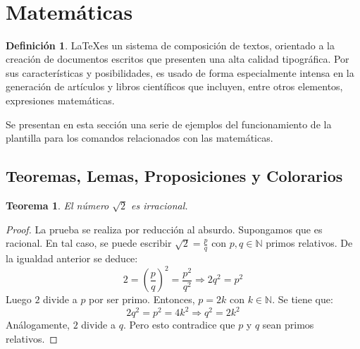 \documentclass{article}
\title{                                             %
    \vspace{2in}
    \textmd{\textbf{\asignatura \\ \titulo}} \\         %
    \normalsize\vspace{0.1in}\small{\fecha}  \\         %
    \vspace{3in}
}
\author{\textbf{\autor}}                            %
\date{}                                             %
\theoremstyle{theorem-style}  %
\newtheorem{theorem}{Teorema}[section]  %
\theoremstyle{definition}
\newtheorem{definition}{Definición}[section]
\theoremstyle{example-style}
\begin{document}
\maketitle



\newpage
\tableofcontents
\newpage


\section{Matemáticas}

    \begin{definition}
        \LaTeX es un sistema de composición de textos, orientado a la creación de documentos escritos que presenten una alta calidad tipográfica. Por sus características y  posibilidades, es usado de forma especialmente intensa en la generación de artículos y libros científicos que incluyen, entre otros elementos, expresiones matemáticas.
    \end{definition}
    
    Se presentan en esta sección una serie de ejemplos del funcionamiento de la plantilla 
    para los comandos relacionados con las matemáticas.
    
    \subsection{Teoremas, Lemas, Proposiciones y Colorarios}
    
        \begin{theorem}
            El número $\sqrt{2}$ es irracional.
        \end{theorem}
        \begin{proof}
            La prueba se realiza por reducción al absurdo. Supongamos que es racional. En tal caso, se puede escribir $\sqrt{2} = \frac{p}{q}$ con $p,q \in \mathbb{N}$ primos relativos. De la igualdad anterior se deduce:
            $$ 2 = \left(\frac{p}{q}\right)^2 = \frac{p^2}{q^2} \Rightarrow 2 q^2 = p^2 $$
            Luego $2$ divide a $p$ por ser primo. Entonces, $p = 2k$ con $k \in \mathbb{N}$. Se tiene que:
            $$ 2 q^2 = p^2 = 4k^2 \Rightarrow q^2 = 2k^2 $$
            Análogamente, $2$ divide a $q$. Pero esto contradice que $p$ y $q$ sean primos relativos.
        \end{proof}
        
\end{document}

